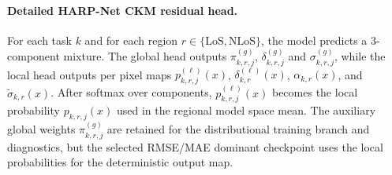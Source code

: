 \paragraph{Detailed HARP-Net CKM residual head.}
For each task
$k$ and for each region
$r \in \{\mathrm{LoS},\mathrm{NLoS}\}$, the model predicts a 3-component
mixture. The global head outputs
$\pi^{(g)}_{k,r,j}$, $\delta^{(g)}_{k,r,j}$ and $\sigma^{(g)}_{k,r,j}$, while
the local head outputs per pixel maps
$p^{(\ell)}_{k,r,j}(x)$, $\delta^{(\ell)}_{k,r}(x)$, $\alpha_{k,r}(x)$, and
$\tilde\sigma_{k,r}(x)$.
After softmax over components, \(p^{(\ell)}_{k,r,j}(x)\) becomes the local
probability \(p_{k,r,j}(x)\) used in the regional model space mean. The auxiliary
global weights \(\pi^{(g)}_{k,r,j}\) are retained for the distributional
training branch and diagnostics, but the selected RMSE/MAE dominant checkpoint
uses the local probabilities for the deterministic output map.

